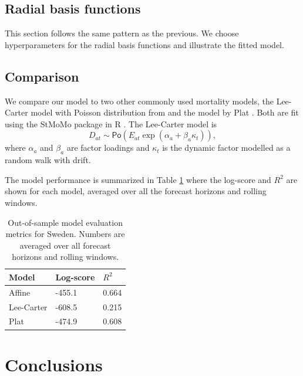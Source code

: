 \documentclass[preprint,12pt]{elsarticle}
\newcommand{\pa}[1]{\left(#1\right)}
\begin{document}
\subsection{Radial basis functions}

This section follows the same pattern as the previous. We choose hyperparameters for the radial basis functions and illustrate the fitted model.


\subsection{Comparison}
We compare our model to two other commonly used mortality models, the Lee-Carter model with Poisson distribution from \cite{brouhns2002poisson} and the model by Plat \cite{plat2009stochastic}. Both are fit using the StMoMo package in R \cite{stmomo2018}. The Lee-Carter model is
$$
D_{at}\sim \mathsf{Po}(E_{at}\exp\pa{\alpha_a + \beta_a\kappa_t}),
$$
where $\alpha_a$ and $\beta_a$ are factor loadings and $\kappa_t$ is the dynamic factor modelled as a random walk with drift.

The model performance is summarized in Table \ref{table:model_comparision_sweden} where the log-score and $R^2$ are shown for each model, averaged over all the forecast horizons and rolling windows.
\begin{table}[h!]
    \centering
    \begin{tabular}{l l l} 
        \hline
        Model & Log-score & $R^2$ \\  
        \hline\hline
        Affine & -455.1 & 0.664 \\
        Lee-Carter & -608.5 & 0.215 \\ 
        Plat & -474.9 & 0.608 \\
        \hline
    \end{tabular}
    \caption{Out-of-sample model evaluation metrics for Sweden. Numbers are averaged over all forecast horizons and rolling windows.}
    \label{table:model_comparision_sweden}
\end{table}


\section{Conclusions}\label{sec:conclusions}


\end{document}
